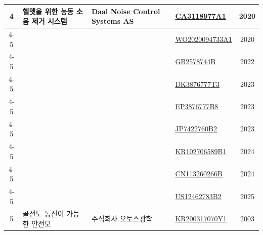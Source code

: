 \documentclass{article}
\begin{document}
\begin{table}[!h]
\begin{tabular}{|c|p{6.5cm}|p{3.5cm}|p{3cm}|c|}
    \multirow{9}{*}{4} 
    & \multirow{9}{=}{헬멧을 위한 능동 소음 제거 시스템} 
    & \multirow{9}{=}{Daal Noise Control Systems AS} 
    & \href{https://patents.google.com/patent/CA3118977A1/en?oq=US12462783B2}{CA3118977A1} & 2020 \\ \cline{4-5}
    &  &  & \href{https://patents.google.com/patent/WO2020094733A1/en?oq=US12462783B2}{WO2020094733A1} & 2020 \\ \cline{4-5}
    &  &  & \href{https://patents.google.com/patent/GB2578744B/en?oq=US12462783B2}{GB2578744B} & 2022 \\ \cline{4-5}
    &  &  & \href{https://patents.google.com/patent/DK3876777T3/en?oq=US12462783B2}{DK3876777T3} & 2023 \\ \cline{4-5}
    &  &  & \href{https://patents.google.com/patent/EP3876777B8/en?oq=US12462783B2}{EP3876777B8} & 2023 \\ \cline{4-5}
    &  &  & \href{https://patents.google.com/patent/JP7422760B2/en?oq=US12462783B2}{JP7422760B2} & 2023 \\ \cline{4-5}
    &  &  & \href{https://patents.google.com/patent/KR102706589B1/en?oq=US12462783B2}{KR102706589B1} & 2024 \\ \cline{4-5}
    &  &  & \href{https://patents.google.com/patent/CN113260266B/en?oq=US12462783B2}{CN113260266B} & 2024 \\ \cline{4-5}
    &  &  & \href{https://patents.google.com/patent/US12462783B2/en?oq=US12462783B2}{US12462783B2} & 2025 \\ 
    \hline
    5 
    & 골전도 통신이 가능한 안전모 
    & 주식회사 오토스광학 
    & \href{https://patents.google.com/patent/KR200317070Y1/en?oq=KR200317070Y1}{KR200317070Y1} 
    & 2003 \\
    \hline
    
    

\end{tabular}
\end{table}
\end{document}
